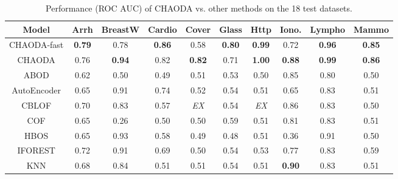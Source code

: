 \begin{table}[!t]
\caption{Performance (ROC AUC) of CHAODA vs. other methods on the 18 test datasets.}
\label{table:results:test-performance}
\vskip 0.15in
\begin{center}
\begin{small}
\begin{sc}
\begin{tabular}{|c|c|c|c|c|c|c|c|c|c|}
\hline
\textbf{Model} & \textbf{Arrh} & \textbf{BreastW} & \textbf{Cardio} & \textbf{Cover} & \textbf{Glass} & \textbf{Http} & \textbf{Iono.} & \textbf{Lympho} & \textbf{Mammo} \\
\hline
CHAODA-fast    & \textbf{0.79} &             0.78 &   \textbf{0.86} &           0.58 & \textbf{0.80}  & \textbf{0.99} &           0.72 &   \textbf{0.96} &  \textbf{0.85} \\
\hline
CHAODA         &          0.76 &    \textbf{0.94} &            0.82 &  \textbf{0.82} &           0.71 & \textbf{1.00} &  \textbf{0.88} &   \textbf{0.99} &  \textbf{0.86} \\
\hline
ABOD           &          0.62 &             0.50 &            0.49 &           0.51 &           0.53 &          0.50 &           0.85 &            0.80 &           0.50 \\
\hline
AutoEncoder    &          0.65 &             0.91 &            0.74 &           0.52 &           0.54 &          0.51 &           0.65 &            0.83 &           0.51 \\
\hline
CBLOF          &          0.70 &             0.83 &            0.57 &    \textit{EX} &           0.54 &   \textit{EX} &           0.86 &            0.83 &           0.50 \\
\hline
COF            &          0.65 &             0.26 &            0.50 &           0.50 &           0.59 &          0.51 &           0.81 &            0.83 &           0.51 \\
\hline
HBOS           &          0.65 &             0.93 &            0.58 &           0.49 &           0.48 &          0.51 &           0.36 &            0.91 &           0.50 \\
\hline
IFOREST        &          0.72 &             0.91 &            0.69 &           0.50 &           0.54 &          0.53 &           0.77 &            0.83 &           0.59 \\
\hline
KNN            &          0.68 &             0.84 &            0.51 &           0.51 &           0.54 &          0.51 &  \textbf{0.90} &            0.83 &           0.51 \\

\end{tabular}
\end{sc}
\end{small}
\end{center}
\end{table}
